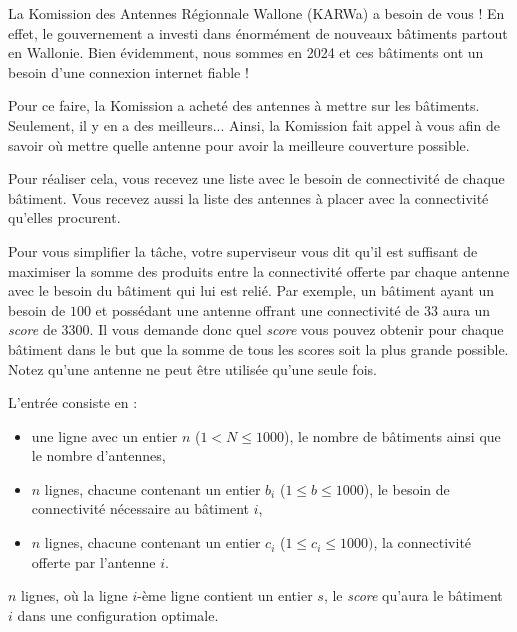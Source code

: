 \problemname{\problemyamlname}


La Komission des Antennes Régionnale Wallone (KARWa) a besoin de vous ! En effet, le gouvernement a investi dans énormément de nouveaux bâtiments partout en Wallonie. Bien évidemment, nous sommes en 2024 et ces bâtiments ont un besoin d'une connexion internet fiable !

Pour ce faire, la Komission a acheté des antennes à mettre sur les bâtiments. Seulement, il y en a des meilleurs... Ainsi, la Komission fait appel à vous afin de savoir où mettre quelle antenne pour avoir la meilleure couverture possible.

Pour réaliser cela, vous recevez une liste avec le besoin de connectivité de chaque bâtiment. Vous recevez aussi la liste des antennes à placer avec la connectivité qu'elles procurent.

Pour vous simplifier la tâche, votre superviseur vous dit qu'il est suffisant de maximiser la somme des produits entre la connectivité offerte par chaque antenne avec le besoin du bâtiment qui lui est relié. Par exemple, un bâtiment ayant un besoin de $100$ et possédant une antenne offrant une connectivité de $33$ aura un \emph{score} de $3300$. Il vous demande donc quel \emph{score} vous pouvez obtenir pour chaque bâtiment dans le but que la somme de tous les scores soit la plus grande possible. Notez qu'une antenne ne peut être utilisée qu'une seule fois.

\begin{Input}
    L'entrée consiste en :
    \begin{itemize}
      \item une ligne avec un entier $n$ ($1 < N \leq 1000$), le nombre de bâtiments ainsi que le nombre d'antennes,
      \item $n$ lignes, chacune contenant un entier $b_i$ ($1 \leq b \leq 1000$), le besoin de connectivité nécessaire au bâtiment $i$,
      \item $n$ lignes, chacune contenant un entier $c_i$ ($1 \leq c_i \leq 1000)$, la connectivité offerte par l'antenne $i$.
    \end{itemize}
\end{Input}

\begin{Output}
  $n$ lignes, où la ligne $i$-ème ligne contient un entier $s$, le \emph{score} qu'aura le bâtiment $i$ dans une configuration optimale.
\end{Output}

